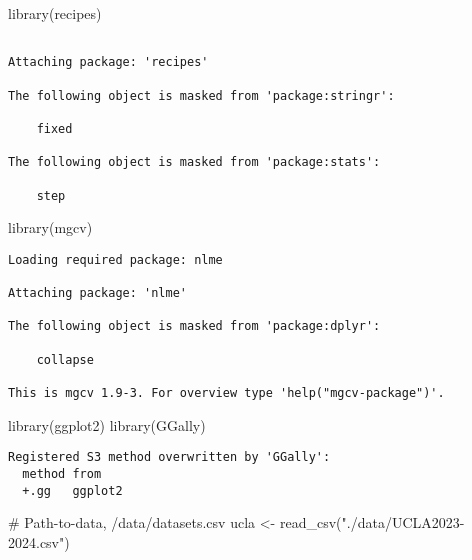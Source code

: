 \documentclass[
  letterpaper,
  DIV=11,
  numbers=noendperiod]{scrartcl}
\newenvironment{Shaded}{\begin{snugshade}}{\end{snugshade}}
\newcommand{\CommentTok}[1]{\textcolor[rgb]{0.37,0.37,0.37}{#1}}
\newcommand{\FunctionTok}[1]{\textcolor[rgb]{0.28,0.35,0.67}{#1}}
\newcommand{\NormalTok}[1]{\textcolor[rgb]{0.00,0.23,0.31}{#1}}
\newcommand{\OtherTok}[1]{\textcolor[rgb]{0.00,0.23,0.31}{#1}}
\newcommand{\StringTok}[1]{\textcolor[rgb]{0.13,0.47,0.30}{#1}}
\begin{document}
\begin{Shaded}
\begin{Highlighting}[]
\FunctionTok{library}\NormalTok{(recipes)}
\end{Highlighting}
\end{Shaded}

\begin{verbatim}

Attaching package: 'recipes'

The following object is masked from 'package:stringr':

    fixed

The following object is masked from 'package:stats':

    step
\end{verbatim}

\begin{Shaded}
\begin{Highlighting}[]
\FunctionTok{library}\NormalTok{(mgcv)}
\end{Highlighting}
\end{Shaded}

\begin{verbatim}
Loading required package: nlme

Attaching package: 'nlme'

The following object is masked from 'package:dplyr':

    collapse

This is mgcv 1.9-3. For overview type 'help("mgcv-package")'.
\end{verbatim}

\begin{Shaded}
\begin{Highlighting}[]
\FunctionTok{library}\NormalTok{(ggplot2)}
\FunctionTok{library}\NormalTok{(GGally)}
\end{Highlighting}
\end{Shaded}

\begin{verbatim}
Registered S3 method overwritten by 'GGally':
  method from   
  +.gg   ggplot2
\end{verbatim}

\begin{Shaded}
\begin{Highlighting}[]
\CommentTok{\# Path{-}to{-}data, /data/datasets.csv}
\NormalTok{ucla }\OtherTok{\textless{}{-}} \FunctionTok{read\_csv}\NormalTok{(}\StringTok{"./data/UCLA2023{-}2024.csv"}\NormalTok{)}
\end{Highlighting}
\end{Shaded}
\end{document}
